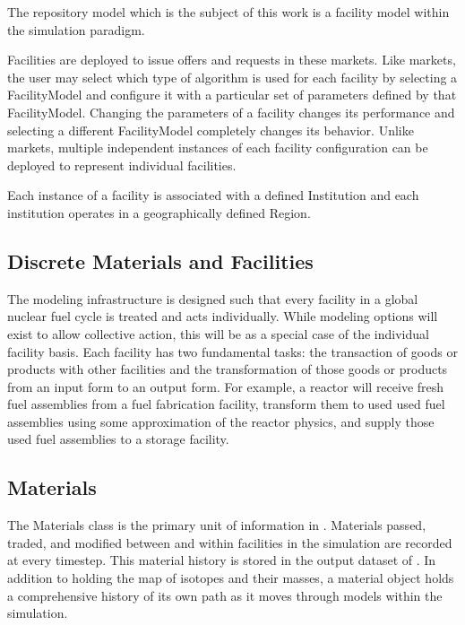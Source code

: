 The repository model which is the subject of this work is a facility 
model within the \Cyclus simulation paradigm. 

Facilities are deployed to issue offers and requests in these markets.  
Like markets, the user may select which type of algorithm is used for 
each facility by selecting a FacilityModel and configure it with a 
particular set of parameters defined by that FacilityModel.  Changing 
the parameters of a facility changes its performance and selecting a 
different FacilityModel completely changes its behavior.  Unlike 
markets, multiple independent instances of each facility configuration 
can be deployed to represent individual facilities.

Each instance of a facility is associated with a defined Institution 
and each institution operates in a geographically defined Region.

\subsection{Discrete Materials and Facilities}

The \Cyclus modeling infrastructure is designed such that every
facility in a global nuclear fuel cycle is treated and acts
individually. While modeling options will exist to allow collective
action, this will be as a special case of the individual facility
basis. Each facility has two fundamental tasks: the transaction of
goods or products with other facilities and the transformation of
those goods or products from an input form to an output form.  For
example, a reactor will receive fresh fuel assemblies from a fuel
fabrication facility, transform them to used used fuel assemblies
using some approximation of the reactor physics, and supply those used
fuel assemblies to a storage facility.

\subsection{Materials}

The Materials class is the primary unit of information in \Cyclus.  
Materials passed, traded, and modified between and within facilities 
in the simulation are recorded at every timestep.  This material 
history is stored in the output dataset of \Cyclus. In addition to 
holding the map of isotopes and their masses, a material object holds 
a comprehensive history of its own path as it moves through models 
within the simulation. 

